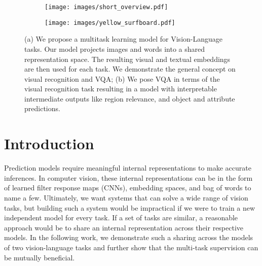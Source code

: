 \documentclass[10pt,twocolumn,letterpaper]{article}
\newcommand\todo[1]{\textcolor{red}{#1}}
\begin{document}
\begin{figure}[t]
\centering
\begin{subfigure}[b]{\linewidth}
\texttt{[image: images/short\_overview.pdf]}
\caption{}
\label{fig:short_overview}
\end{subfigure}
\centering
\begin{subfigure}[b]{\linewidth}
\texttt{[image: images/yellow\_surfboard.pdf]}
\caption{}
\label{fig:teaser_interpert}
\end{subfigure}

\caption{(a) We propose a multitask learning model for Vision-Language tasks. Our model projects images and words into a shared representation space. The resulting visual and textual embeddings are then used for each task. We demonstrate the general concept on visual recognition and VQA; (b) We pose VQA in terms of the visual recognition task resulting in a model with interpretable intermediate outputs like region relevance, and object and attribute predictions.}
\end{figure}

\section{Introduction}


    Prediction models require meaningful internal representations
    to make accurate inferences. In computer vision, these internal representations can be in the form of learned filter response maps (CNNs), embedding spaces, and bag of words to name a few. Ultimately, we want systems that can solve a wide range of vision tasks, but building such a system would be impractical if we were to train a new independent model for every task. If a set of tasks are similar, a reasonable approach would be to share an internal representation across their respective models. In the following work, we demonstrate such a sharing across the models of two vision-language tasks and further show that the multi-task supervision can be mutually beneficial.
    
\end{document}
